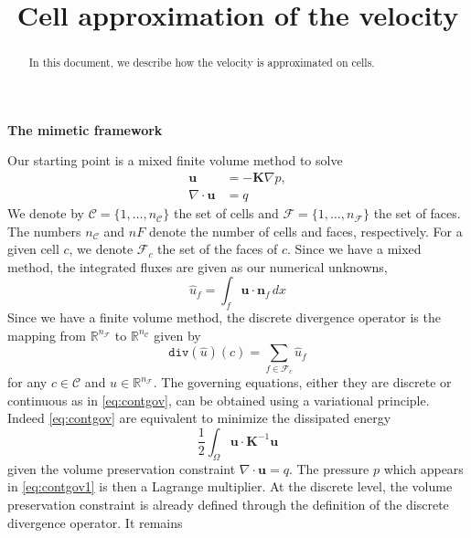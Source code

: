 \documentclass[11pt]{amsart}
\newcommand{\Real}{\mathbb R}
\newcommand{\vect}[1]{\boldsymbol{#1}}
\newcommand{\mat}[1]{\boldsymbol{#1}}
\newcommand{\grad}{\nabla}
\newcommand{\dive}{\nabla\cdot}
\newcommand{\Fcal}{\mathcal{F}}
\newcommand{\Ccal}{\mathcal{C}}
\let\code\texttt
\newcommand{\ddiv}{\code{div}\xspace}%
\newcommand{\nC}{{n_{\Ccal}}}%
\newcommand{\nF}{{n_{\Fcal}}}%
\begin{document}
\title[velocity approximation]{Cell approximation of the velocity}

\maketitle

\begin{abstract}
  In this document, we describe how the velocity is approximated on cells.
\end{abstract}

\textbf{The mimetic framework}

Our starting point is a mixed finite volume method to solve
\begin{subequations}
  \label{eq:contgov}
  \begin{align}
    \label{eq:contgov1}
    \vect{u} &= - \mat{K}\grad p,\\
    \dive \vect{u} &= q
  \end{align}
\end{subequations}
We denote by $\Ccal=\{1,\ldots,\nC\}$ the set of cells and $\Fcal=\{1,\ldots,\nF\}$ the set of
faces. The numbers $\nC$ and $nF$ denote the number of cells and faces, respectively. For a given
cell $c$, we denote $\Fcal_c$ the set of the faces of $c$. Since we have a mixed method, the
integrated fluxes are given as our numerical unknowns,
\begin{equation}
  \label{eq:defuf}
  \hat{u}_f = \int_{f}\vect{u}\cdot\vect{n}_f\,dx
\end{equation}
Since we have a finite volume method, the discrete divergence operator is the mapping from
$\Real^\nF$ to $\Real^\nC$ given by
\begin{equation}
  \label{eq:defdiv}
  \ddiv(\hat{u})(c) = \sum_{f\in\Fcal_c}\hat{u}_f
\end{equation}
for any $c\in\Ccal$ and $u\in\Real^{\nF}$. The governing equations, either they are discrete or
continuous as in \eqref{eq:contgov}, can be obtained using a variational principle. Indeed
\eqref{eq:contgov} are equivalent to minimize the dissipated energy
\begin{equation}
  \label{eq:totenergy}
  \frac12\int_{\Omega} \vect{u}\cdot\mat{K}^{-1}\vect{u}
\end{equation}
given the volume preservation constraint $\dive\vect{u} = q $. The pressure $p$ which appears in
\eqref{eq:contgov1} is then a Lagrange multiplier. At the discrete level, the volume preservation
constraint is already defined through the definition of the discrete divergence operator. It remains
\end{document}
